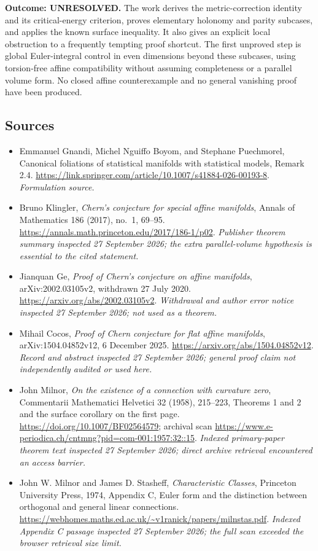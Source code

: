 \documentclass[11pt]{article}
\begin{document}
\textbf{Outcome: UNRESOLVED.}
The work derives the metric-correction identity and its critical-energy
criterion, proves elementary holonomy and parity subcases, and applies the
known surface inequality. It also gives an explicit local obstruction to
a frequently tempting proof shortcut. The first unproved step is global
Euler-integral control in even dimensions beyond these subcases, using
torsion-free affine compatibility without assuming completeness or a
parallel volume form. No closed affine counterexample and no general
vanishing proof have been produced.

\subsection{Sources}
\begin{itemize}
\item[S1]Emmanuel Gnandi, Michel Nguiffo Boyom, and Stephane Puechmorel, Canonical foliations of statistical manifolds with statistical models, Remark 2.4.
\url{https://link.springer.com/article/10.1007/s41884-026-00193-8}.
\textit{Formulation source.}
\item[E1]Bruno Klingler, \emph{Chern's conjecture for special affine
manifolds}, Annals of Mathematics 186 (2017), no.~1, 69--95.
\url{https://annals.math.princeton.edu/2017/186-1/p02}.
\textit{Publisher theorem summary inspected 27 September 2026; the extra
parallel-volume hypothesis is essential to the cited statement.}
\item[E2]Jianquan Ge, \emph{Proof of Chern's conjecture on affine manifolds},
arXiv:2002.03105v2, withdrawn 27 July 2020.
\url{https://arxiv.org/abs/2002.03105v2}.
\textit{Withdrawal and author error notice inspected 27 September 2026;
not used as a theorem.}
\item[E3]Mihail Cocos, \emph{Proof of Chern conjecture for flat affine
manifolds}, arXiv:1504.04852v12, 6 December 2025.
\url{https://arxiv.org/abs/1504.04852v12}.
\textit{Record and abstract inspected 27 September 2026; general proof
claim not independently audited or used here.}
\item[E4]John Milnor, \emph{On the existence of a connection with curvature
zero}, Commentarii Mathematici Helvetici 32 (1958), 215--223, Theorems 1
and 2 and the surface corollary on the first page.
\url{https://doi.org/10.1007/BF02564579};
archival scan
\url{https://www.e-periodica.ch/cntmng?pid=com-001:1957:32::15}.
\textit{Indexed primary-paper theorem text inspected 27 September 2026;
direct archive retrieval encountered an access barrier.}
\item[E5]John W. Milnor and James D. Stasheff,
\emph{Characteristic Classes}, Princeton University Press, 1974,
Appendix C, Euler form and the distinction between orthogonal and general
linear connections.
\url{https://webhomes.maths.ed.ac.uk/~v1ranick/papers/milnstas.pdf}.
\textit{Indexed Appendix C passage inspected 27 September 2026;
the full scan exceeded the browser retrieval size limit.}
\end{itemize}
\end{document}
